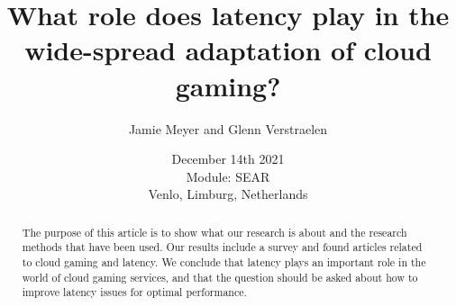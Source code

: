 \documentclass[]{report}
\title{What role does latency play in the wide-spread adaptation of cloud gaming?}
\author{Jamie Meyer and Glenn Verstraelen}
\date{December 14th 2021 \\Module: SEAR \\Venlo, Limburg, Netherlands}
\begin{document}
\maketitle

\begin{abstract}
The purpose of this article is to show what our research is about and the research methods that have been used. Our results include a survey and found articles related to cloud gaming and latency. We conclude that latency plays an important role in the world of cloud gaming services, and that the question should be asked about how to improve latency issues for optimal performance. 
\end{abstract}

\tableofcontents
\setcounter{page}{3}
{%
	\let\oldnumberline\numberline%
	\renewcommand{\numberline}{\figurename~\oldnumberline}%
	\listoffigures%
}
\pagebreak
{}	
	
 
 
 
 

\printbibliography[title=References]

\appendix

\end{document}

